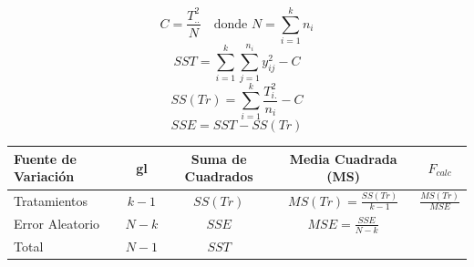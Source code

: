 \documentclass[12pt,a4paper]{article}
\begin{document}
\[
C = \frac{T_{..}^2}{N} \quad \text{donde } N=\sum_{i=1}^{k} n_i
\]
\[
SST = \sum_{i=1}^{k}\sum_{j=1}^{n_i} y_{ij}^2 - C
\]
\[
SS(Tr) = \sum_{i=1}^{k} \frac{T_{i.}^2}{n_i} - C
\]
\[
SSE = SST - SS(Tr)
\]

\begin{center}
{\fontsize{12.5}{15}\selectfont
\begin{tabular}{l c c c c}
\toprule
\textbf{Fuente de Variación} & \textbf{gl} & \textbf{Suma de Cuadrados} & \textbf{Media Cuadrada (MS)} & $F_{calc}$ \\
\midrule
Tratamientos & $k-1$ & $SS(Tr)$ & $MS(Tr)=\frac{SS(Tr)}{k-1}$ & $\frac{MS(Tr)}{MSE}$ \\
Error Aleatorio & $N-k$ & $SSE$ & $MSE=\frac{SSE}{N-k}$ & \\
\midrule
Total & $N-1$ & $SST$ & & \\
\bottomrule
\end{tabular}
}
\end{center}
\end{document}
